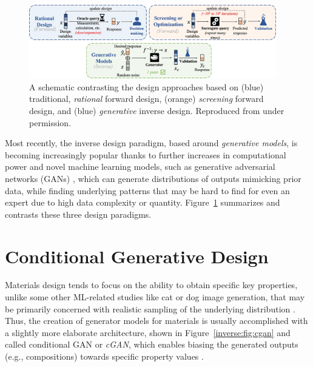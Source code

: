 \begin{figure}[H]
    \centering
    \includegraphics[width=0.96\textwidth]{inversedesign/inverse_fig1.png}
    \caption{A schematic contrasting the design approaches based on (blue) traditional, \emph{rational} forward design, (orange) \emph{screening} forward design, and (blue) \emph{generative} inverse design. Reproduced from \cite{Debnath2023ComparingAlloys} under permission.}
    \label{inverse:fig:designs}
\end{figure}

Most recently, the inverse design paradigm, based around \emph{generative models}, is becoming increasingly popular thanks to further increases in computational power and novel machine learning models, such as generative adversarial networks (GANs) \cite{Goodfellow2020GenerativeNetworks}, which can generate distributions of outputs mimicking prior data, while finding underlying patterns that may be hard to find for even an expert due to high data complexity or quantity. Figure~\ref{inverse:fig:designs} summarizes and contrasts these three design paradigms.


\section{Conditional Generative Design} \label{inverse:sec:cgan}

Materials design tends to focus on the ability to obtain specific key properties, unlike some other ML-related studies like cat or dog image generation, that may be primarily concerned with realistic sampling of the underlying distribution \cite{Ching-YuanBaiJuliaElliott2019GenerativeImages}. Thus, the creation of generator models for materials is usually accomplished with a slightly more elaborate architecture, shown in Figure~\ref{inverse:fig:cgan} and called conditional GAN or \emph{cGAN}, which enables biasing the generated outputs (e.g., compositions) towards specific property values \cite{Mirza2014ConditionalNets, Arjovsky2017WassersteinNetworks}.

